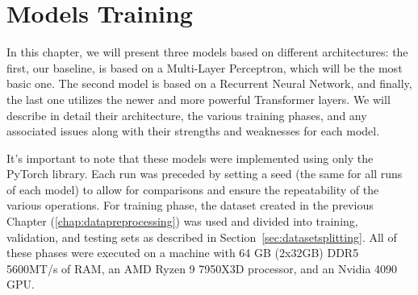 \chapter{Models Training}
In this chapter, we will present three models based on
different architectures: the first, our baseline, is based on a
Multi-Layer Perceptron, which will be the most basic one.
The second model is based on a Recurrent Neural Network, and finally,
the last one utilizes the newer and more powerful Transformer layers.
We will describe in detail their architecture, the various training phases,
and any associated issues along with their strengths and weaknesses
for each model.

It's important to note that these models were implemented using only
the PyTorch library.
Each run was preceded by setting a seed (the same for all runs of each model)
to allow for comparisons and ensure the repeatability of the
various operations. For training phase, the dataset created in the
previous Chapter (\ref{chap:datapreprocessing}) was used and divided
into training, validation, and testing sets as described in Section~\ref{sec:datasetsplitting}.
All of these phases were executed on a machine with 64 GB (2x32GB) DDR5 5600MT/s of RAM,
an AMD Ryzen 9 7950X3D processor, and an Nvidia 4090 GPU.

%
%



